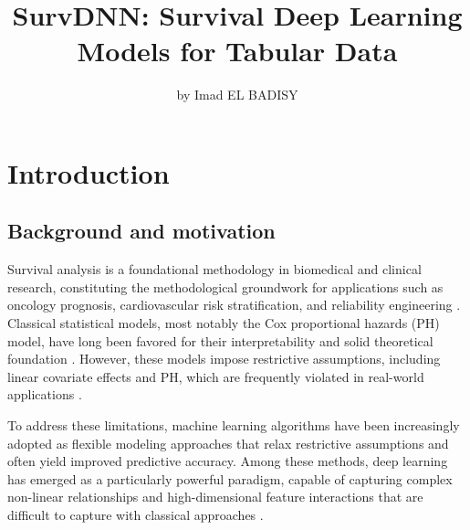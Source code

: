 \title{SurvDNN: Survival Deep Learning Models for Tabular Data}


\author{by Imad EL BADISY}

\maketitle


\section{Introduction}\label{introduction}

\subsection{Background and motivation}\label{background-and-motivation}

Survival analysis is a foundational methodology in biomedical and clinical research, constituting the methodological groundwork for applications such as oncology prognosis, cardiovascular risk stratification, and reliability engineering \citep{wiegrebe2024deep}. Classical statistical models, most notably the Cox proportional hazards (PH) model, have long been favored for their interpretability and solid theoretical foundation \citep{cox1972regression}. However, these models impose restrictive assumptions, including linear covariate effects and PH, which are frequently violated in real-world applications \citep{heagerty2005survival, batson2016review}.

To address these limitations, machine learning algorithms have been increasingly adopted as flexible modeling approaches that relax restrictive assumptions and often yield improved predictive accuracy. Among these methods, deep learning has emerged as a particularly powerful paradigm, capable of capturing complex non-linear relationships and high-dimensional feature interactions that are difficult to capture with classical approaches \citep{wiegrebe2024deep, bengio2021deep}.

